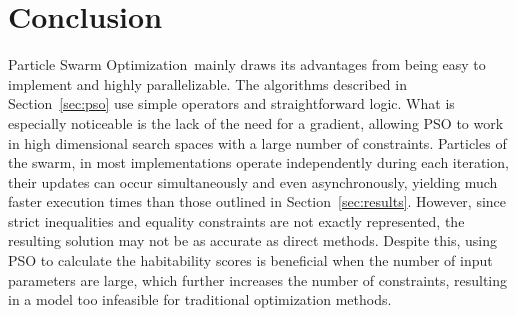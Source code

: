 \documentclass[10pt]{article}
\newcommand{\pso}{Particle Swarm Optimization}
\begin{document}
\section{Conclusion}\label{sec:conc}

\pso\ mainly draws its advantages from being easy to implement and highly parallelizable. The algorithms described in
Section~\ref{sec:pso} use simple operators and straightforward logic. What is especially noticeable is the lack of the
need for a gradient, allowing PSO to work in high dimensional search spaces with a large number of constraints.
Particles of the swarm, in most implementations operate independently during each iteration, their updates can occur
simultaneously and even asynchronously, yielding much faster execution times than those outlined in
Section~\ref{sec:results}. However, since strict inequalities and equality constraints are not exactly represented, the
resulting solution may not be as accurate as direct methods. Despite this, using PSO to calculate the habitability
scores is beneficial when the number of input parameters are large, which further increases the number of constraints,
resulting in a model too infeasible for traditional optimization methods.


\printbibliography
\end{document}
